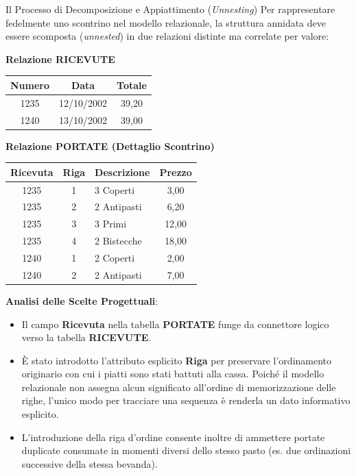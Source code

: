 \documentclass[12pt]{extarticle}
\begin{document}
\begin{cbox}{Il Processo di Decomposizione e Appiattimento (\textit{Unnesting})}
\noindent Per rappresentare fedelmente uno scontrino nel modello relazionale, la struttura annidata deve essere scomposta (\textit{unnested}) in due relazioni distinte ma correlate per valore:
\begin{center}
\small
\textbf{Relazione RICEVUTE} \\[1ex]
\begin{tabular}{ccc}
    \toprule
    \textbf{Numero} & \textbf{Data} & \textbf{Totale} \\
    \midrule
    1235 & 12/10/2002 & 39,20 \\
    1240 & 13/10/2002 & 39,00 \\
    \bottomrule
\end{tabular}
\end{center}
\medskip
\begin{center}
\small
\textbf{Relazione PORTATE (Dettaglio Scontrino)} \\[1ex]
\begin{tabular}{cclc}
    \toprule
    \textbf{Ricevuta} & \textbf{Riga} & \textbf{Descrizione} & \textbf{Prezzo} \\
    \midrule
    1235 & 1 & 3 Coperti & 3,00 \\
    1235 & 2 & 2 Antipasti & 6,20 \\
    1235 & 3 & 3 Primi & 12,00 \\
    1235 & 4 & 2 Bistecche & 18,00 \\
    1240 & 1 & 2 Coperti & 2,00 \\
    1240 & 2 & 2 Antipasti & 7,00 \\
    \bottomrule
\end{tabular}
\end{center}
\medskip
\noindent \textbf{Analisi delle Scelte Progettuali}:
\begin{itemize}
    \item Il campo \textbf{Ricevuta} nella tabella \textbf{PORTATE} funge da connettore logico verso la tabella \textbf{RICEVUTE}.
    \item È stato introdotto l'attributo esplicito \textbf{Riga} per preservare l'ordinamento originario con cui i piatti sono stati battuti alla cassa. Poiché il modello relazionale non assegna alcun significato all'ordine di memorizzazione delle righe, l'unico modo per tracciare una sequenza è renderla un dato informativo esplicito.
    \item L'introduzione della riga d'ordine consente inoltre di ammettere portate duplicate consumate in momenti diversi dello stesso pasto (es. due ordinazioni successive della stessa bevanda).
\end{itemize}
\end{cbox}
\end{document}
